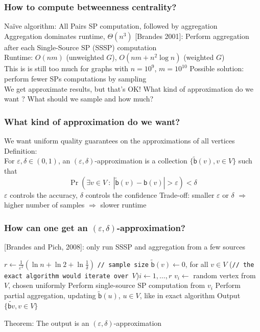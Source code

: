 \documentclass[aspectratio=169]{beamer}
\newcommand*{\betw}{\ensuremath{\mathsf{b}}\xspace}
\begin{document}
\begin{frame}
  \frametitle{How to compute betweenness centrality?}
  Na\"ive algorithm: All Pairs SP computation, followed by aggregation\\
  \quad Aggregation dominates runtime, $\Theta(n^3)$
  \vfill
  [Brandes 2001]: Perform aggregation after each Single-Source SP (SSSP) computation\\
  \quad Runtime: $O(nm)$ (unweighted $G$), $O(nm + n^2\log n)$ (weighted
  $G$)\\
  This is is still too much for graphs with $n=10^9$, $m=10^10$
  \vfill
  Possible solution: perform fewer SPs computations by sampling\\
  \quad We get approximate results, but that's OK!
  \vfill
  What kind of approximation do we want ? What should we sample and how much?
\end{frame}

\begin{frame}
  \frametitle{What kind of approximation do we want?}
  We want uniform quality guarantees on the approximations of all vertices
  \vfill
  Definition:\\
  \quad For $\varepsilon,\delta\in(0,1)$, an $(\varepsilon,\delta)$-approximation is
  a collection $\{\tilde{\betw}(v), v\in V\}$ such that
  \[
    \Pr(\exists v\in V ~:~ |\tilde{\betw}(v) -\betw(v)|>\varepsilon)<\delta
  \]
  $\varepsilon$ controls the accuracy, $\delta$ controls the confidence
  \vfill
  Trade-off: smaller $\varepsilon$ or $\delta$ $\Rightarrow$ higher number of
  samples $\Rightarrow$ slower runtime
\end{frame}

\begin{frame}
  \frametitle{How can one get an $(\varepsilon,\delta)$-approximation?}
  [Brandes and Pich, 2008]: only run SSSP and aggregation from a few sources
  \vfill
  \begin{algorithm}[H]
    \DontPrintSemicolon
    $r\leftarrow \frac{1}{\varepsilon^2}\left(\ln n + \ln 2 +
    \ln\frac{1}{\delta}\right)$ \texttt{// sample size}\;
    $\tilde{\betw}(v)\leftarrow 0$, for all $v\in V$\;
    \For(\texttt{// the exact algorithm would iterate over $V$}){$i\leftarrow 1,\dotsc,r$} {
      $v_i \leftarrow$ random vertex from $V$, chosen uniformly\;
      Perform single-source SP computation from $v_i$\;
      Perform partial aggregation, updating $\tilde{\betw}(u)$, $u\in V$,
      like in exact algorithm\;
    }
    Output $\{\tilde{\betw{v}}, v\in V\}$\;
  \end{algorithm}
  \vfill
  Theorem: The output is an $(\varepsilon,\delta)$-approximation
\end{frame}
\end{document}
